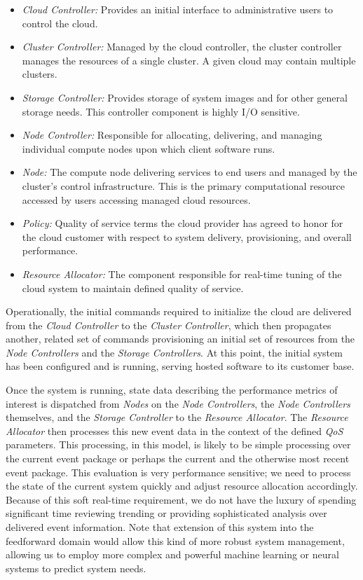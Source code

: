 \documentclass[notitlepage]{book}
\begin{document}
\begin{doublespace}
\begin{itemize}
\item \textit{Cloud Controller:} Provides an initial interface to administrative users to control the cloud.
\item \textit{Cluster Controller:} Managed by the cloud controller, the cluster controller manages the resources of a single cluster. A given cloud may contain multiple clusters.
\item \textit{Storage Controller:} Provides storage of system images and for other general storage needs.  This controller component is highly I/O sensitive.
\item \textit{Node Controller:} Responsible for allocating, delivering, and managing individual compute nodes upon which client software runs.
\item \textit{Node:} The compute node delivering services to end users and managed by the cluster's control infrastructure.  This is the primary computational resource accessed by users accessing managed cloud resources.
\item \textit{Policy:} Quality of service terms the cloud provider has agreed to honor for the cloud customer with respect to system delivery, provisioning, and overall performance.
\item \textit{Resource Allocator:} The component responsible for real-time tuning of the cloud system to maintain defined quality of service.
\end{itemize}

Operationally, the initial commands required to initialize the cloud are delivered from the \textit{Cloud Controller} to the \textit{Cluster Controller}, which then propagates another, related set of commands provisioning an initial set of resources from the \textit{Node Controllers} and the \textit{Storage Controllers}.  At this point, the initial system has been configured and is running, serving hosted software to its customer base.

Once the system is running, state data describing the performance metrics of interest is dispatched from \textit{Nodes} on the \textit{Node Controllers}, the \textit{Node Controllers} themselves, and the \textit{Storage Controller} to the \textit{Resource Allocator}.  The \textit{Resource Allocator} then processes this new event data in the context of the defined \textit{QoS} parameters.  This processing, in this model, is likely to be simple processing over the current event package or perhaps the current and the otherwise most recent event package.  This evaluation is very performance sensitive; we need to process the state of the current system quickly and adjust resource allocation accordingly.  Because of this soft real-time requirement, we do not have the luxury of spending significant time reviewing trending or providing sophisticated analysis over delivered event information.  Note that extension of this system into the feedforward domain would allow this kind of more robust system management, allowing us to employ more complex and powerful machine learning or neural systems to predict system needs.


\end{doublespace}
\end{document}
